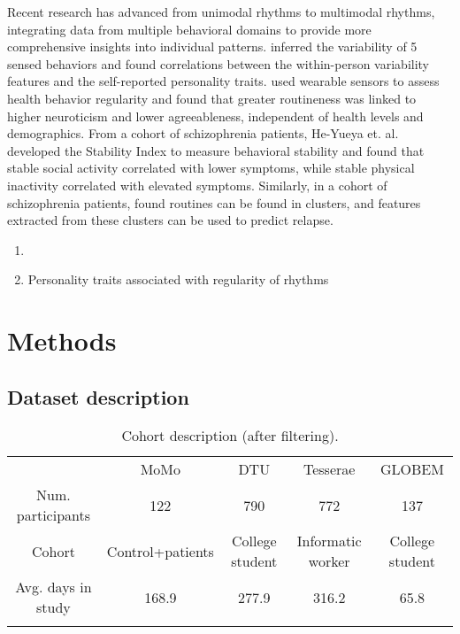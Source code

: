 \documentclass[pdflatex,sn-vancouver,Numbered]{bst/sn-jnl}%
\theoremstyle{thmstyleone}%
\theoremstyle{thmstyletwo}%
\theoremstyle{thmstylethree}%
\begin{document}
Recent research has advanced from unimodal rhythms to multimodal rhythms, integrating data from multiple behavioral domains to provide more comprehensive insights into individual patterns. \cite{wang2018sensing} inferred the variability of 5 sensed behaviors and found correlations between the within-person variability features and the self-reported personality traits. \cite{amon2022flexibility} used wearable sensors to assess health behavior regularity and found that greater routineness was linked to higher neuroticism and lower agreeableness, independent of health levels and demographics. From a cohort of schizophrenia patients, He-Yueya et. al. \cite{he-yueyaAssessingRelationshipRoutine2020} developed the Stability Index to measure behavioral stability and found that stable social activity correlated with lower symptoms, while stable physical inactivity correlated with elevated symptoms. Similarly, in a cohort of schizophrenia patients, \cite{zhou2022predicting} found routines can be found in clusters, and features extracted from these clusters can be used to predict relapse. 


\begin{enumerate}
    \item 
    \item Personality traits associated with regularity of rhythms
\end{enumerate}

\section{Methods}\label{sec2}

\subsection*{Dataset description}

\begin{table}[!htbp]
    \centering
    \begin{tabular}{ccccc}
         &  MoMo&  DTU&  Tesserae &GLOBEM \\
         Num. participants & 122  & 790 & 772 & 137 \\
         Cohort & Control+patients & College student  & Informatic worker & College student \\
         Avg. days in study & 168.9 & 277.9 & 316.2  & 65.8 \\
         &  &  &  & \\
    \end{tabular}
    \caption{Cohort description (after filtering).}
    \label{tab:my_label}
\end{table}
\end{document}
